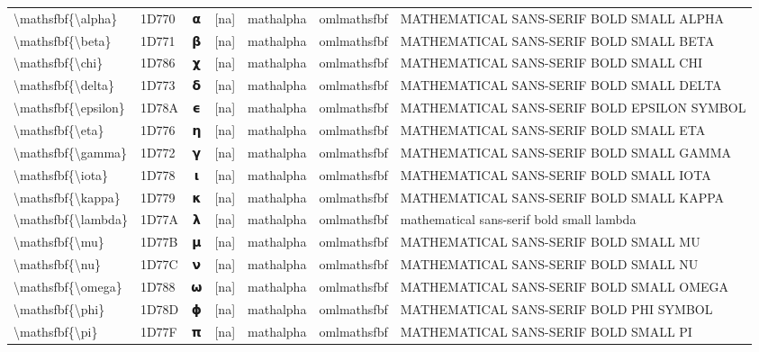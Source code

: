 \documentclass[a4paper,landscape]{article}
\begin{document}
\begin{longtable}{llcclll}
\textbackslash{}mathsfbf\{\textbackslash{}alpha\} & 1D770 & 𝝰 & [na] & mathalpha & omlmathsfbf & MATHEMATICAL SANS-SERIF BOLD SMALL ALPHA \\
\textbackslash{}mathsfbf\{\textbackslash{}beta\} & 1D771 & 𝝱 & [na] & mathalpha & omlmathsfbf & MATHEMATICAL SANS-SERIF BOLD SMALL BETA \\
\textbackslash{}mathsfbf\{\textbackslash{}chi\} & 1D786 & 𝞆 & [na] & mathalpha & omlmathsfbf & MATHEMATICAL SANS-SERIF BOLD SMALL CHI \\
\textbackslash{}mathsfbf\{\textbackslash{}delta\} & 1D773 & 𝝳 & [na] & mathalpha & omlmathsfbf & MATHEMATICAL SANS-SERIF BOLD SMALL DELTA \\
\textbackslash{}mathsfbf\{\textbackslash{}epsilon\} & 1D78A & 𝞊 & [na] & mathalpha & omlmathsfbf & MATHEMATICAL SANS-SERIF BOLD EPSILON SYMBOL \\
\textbackslash{}mathsfbf\{\textbackslash{}eta\} & 1D776 & 𝝶 & [na] & mathalpha & omlmathsfbf & MATHEMATICAL SANS-SERIF BOLD SMALL ETA \\
\textbackslash{}mathsfbf\{\textbackslash{}gamma\} & 1D772 & 𝝲 & [na] & mathalpha & omlmathsfbf & MATHEMATICAL SANS-SERIF BOLD SMALL GAMMA \\
\textbackslash{}mathsfbf\{\textbackslash{}iota\} & 1D778 & 𝝸 & [na] & mathalpha & omlmathsfbf & MATHEMATICAL SANS-SERIF BOLD SMALL IOTA \\
\textbackslash{}mathsfbf\{\textbackslash{}kappa\} & 1D779 & 𝝹 & [na] & mathalpha & omlmathsfbf & MATHEMATICAL SANS-SERIF BOLD SMALL KAPPA \\
\textbackslash{}mathsfbf\{\textbackslash{}lambda\} & 1D77A & 𝝺 & [na] & mathalpha & omlmathsfbf & mathematical sans-serif bold small lambda \\
\textbackslash{}mathsfbf\{\textbackslash{}mu\} & 1D77B & 𝝻 & [na] & mathalpha & omlmathsfbf & MATHEMATICAL SANS-SERIF BOLD SMALL MU \\
\textbackslash{}mathsfbf\{\textbackslash{}nu\} & 1D77C & 𝝼 & [na] & mathalpha & omlmathsfbf & MATHEMATICAL SANS-SERIF BOLD SMALL NU \\
\textbackslash{}mathsfbf\{\textbackslash{}omega\} & 1D788 & 𝞈 & [na] & mathalpha & omlmathsfbf & MATHEMATICAL SANS-SERIF BOLD SMALL OMEGA \\
\textbackslash{}mathsfbf\{\textbackslash{}phi\} & 1D78D & 𝞍 & [na] & mathalpha & omlmathsfbf & MATHEMATICAL SANS-SERIF BOLD PHI SYMBOL \\
\textbackslash{}mathsfbf\{\textbackslash{}pi\} & 1D77F & 𝝿 & [na] & mathalpha & omlmathsfbf & MATHEMATICAL SANS-SERIF BOLD SMALL PI \\

\end{longtable}
\end{document}
